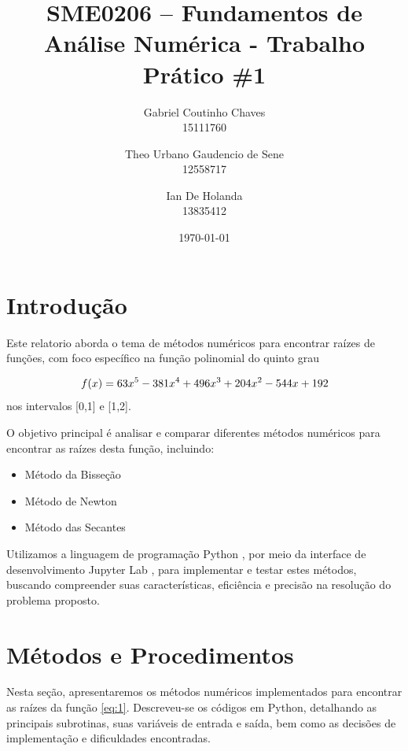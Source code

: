 \documentclass{article}
\title{\textbf{SME0206 -- Fundamentos de An\'{a}lise Num\'{e}rica - Trabalho Pr\'{a}tico \#1}}
\author{Gabriel Coutinho Chaves \\ 15111760 \and Theo Urbano Gaudencio de Sene \\ 12558717 \and Ian De Holanda \\ 13835412}
\date{\today}
\begin{document}
\maketitle


\section{Introdu\c{c}\~{a}o}
Este relatorio aborda o tema de m\'{e}todos num\'{e}ricos para encontrar ra\'{i}zes de fun\c{c}\~{o}es, com foco espec\'{i}fico na fun\c{c}\~{a}o polinomial do quinto grau


\begin{equation}
    f(x) = 63x^5 - 381x^4 + 496x^3 + 204x^2 - 544x + 192
\label{eq:1}
\vspace*{4pt}
\end{equation}
nos intervalos [0,1] e [1,2].


O objetivo principal \'{e} analisar e comparar diferentes m\'{e}todos num\'{e}ricos para encontrar as ra\'{i}zes desta fun\c{c}\~{a}o, incluindo:

\begin{itemize}
    \item M\'{e}todo da Bisse\c{c}\~{a}o
    \item M\'{e}todo de Newton
    \item M\'{e}todo das Secantes
\end{itemize}

Utilizamos a linguagem de programa\c{c}\~{a}o Python \cite{python}, por meio da interface de desenvolvimento Jupyter Lab \cite{jupyter}, para implementar e testar estes m\'{e}todos, buscando compreender suas caracter\'{i}sticas, efici\^{e}ncia e precis\~{a}o na resolu\c{c}\~{a}o do problema proposto.




\section{M\'{e}todos e Procedimentos}
Nesta se\c{c}\~{a}o, apresentaremos os m\'{e}todos num\'{e}ricos implementados para encontrar as ra\'{i}zes da fun\c{c}\~{a}o \eqref{eq:1}. Descreveu-se os c\'{o}digos em Python, detalhando as principais subrotinas, suas vari\'{a}veis de entrada e sa\'{i}da, bem como as decis\~{o}es de implementa\c{c}\~{a}o e dificuldades encontradas.
\end{document}
